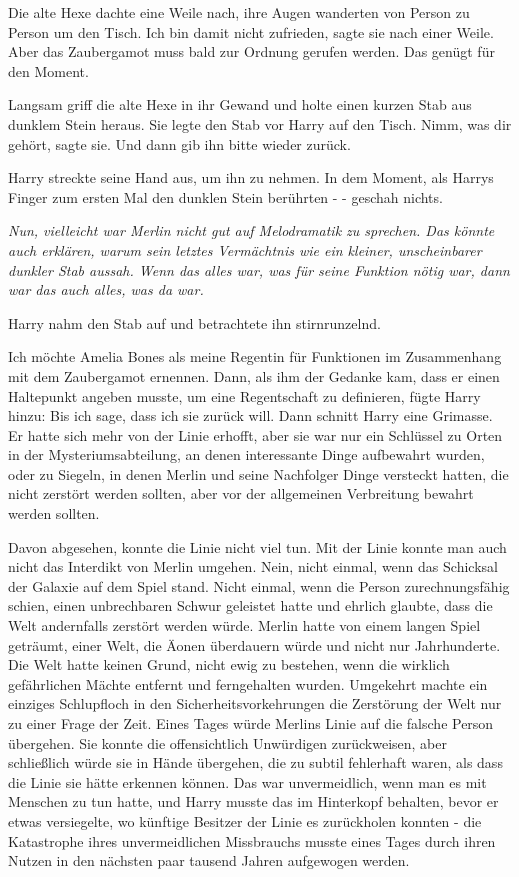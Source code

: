 Die alte Hexe dachte eine Weile nach, ihre Augen wanderten von Person zu Person
um den Tisch. \glqq{}Ich bin damit nicht zufrieden\grqq{}, sagte sie nach einer
Weile. \glqq{}Aber das Zaubergamot muss bald zur Ordnung gerufen werden. Das
genügt für den Moment.\grqq{}

Langsam griff die alte Hexe in ihr Gewand und holte einen kurzen Stab aus
dunklem Stein heraus. Sie legte den Stab vor Harry auf den Tisch. \glqq{}Nimm,
was dir gehört\grqq{}, sagte sie. \glqq{}Und dann gib ihn bitte wieder zurück.\grqq{}

Harry streckte seine Hand aus, um ihn zu nehmen. In dem Moment, als Harrys
Finger zum ersten Mal den dunklen Stein berührten - - geschah nichts.

\emph{Nun, vielleicht war Merlin nicht gut auf Melodramatik zu sprechen. Das
könnte auch erklären, warum sein letztes Vermächtnis wie ein kleiner,
unscheinbarer dunkler Stab aussah. Wenn das alles war, was für seine Funktion
nötig war, dann war das auch alles, was da war.}

Harry nahm den Stab auf und betrachtete ihn stirnrunzelnd.

\glqq{}Ich möchte Amelia Bones als meine Regentin für Funktionen im Zusammenhang
mit dem Zaubergamot ernennen.\grqq{} Dann, als ihm der Gedanke kam, dass er
einen Haltepunkt angeben musste, um eine Regentschaft zu definieren, fügte Harry
hinzu: \glqq{}Bis ich sage, dass ich sie zurück will.\grqq{} Dann schnitt Harry
eine Grimasse. Er hatte sich mehr von der Linie erhofft, aber sie war nur ein
Schlüssel zu Orten in der Mysteriumsabteilung, an denen interessante Dinge
aufbewahrt wurden, oder zu Siegeln, in denen Merlin und seine Nachfolger Dinge
versteckt hatten, die nicht zerstört werden sollten, aber vor der allgemeinen
Verbreitung bewahrt werden sollten.

Davon abgesehen, konnte die Linie nicht viel tun. Mit der Linie konnte man auch
nicht das Interdikt von Merlin umgehen. Nein, nicht einmal, wenn das Schicksal
der Galaxie auf dem Spiel stand. Nicht einmal, wenn die Person zurechnungsfähig
schien, einen unbrechbaren Schwur geleistet hatte und ehrlich glaubte, dass die
Welt andernfalls zerstört werden würde. Merlin hatte von einem langen Spiel
geträumt, einer Welt, die Äonen überdauern würde und nicht nur Jahrhunderte. Die
Welt hatte keinen Grund, nicht ewig zu bestehen, wenn die wirklich gefährlichen
Mächte entfernt und ferngehalten wurden. Umgekehrt machte ein einziges
Schlupfloch in den Sicherheitsvorkehrungen die Zerstörung der Welt nur zu einer
Frage der Zeit. Eines Tages würde Merlins Linie auf die falsche Person
übergehen. Sie konnte die offensichtlich Unwürdigen zurückweisen, aber
schließlich würde sie in Hände übergehen, die zu subtil fehlerhaft waren, als
dass die Linie sie hätte erkennen können. Das war unvermeidlich, wenn man es mit
Menschen zu tun hatte, und Harry musste das im Hinterkopf behalten, bevor er
etwas versiegelte, wo künftige Besitzer der Linie es zurückholen konnten - die
Katastrophe ihres unvermeidlichen Missbrauchs musste eines Tages durch ihren
Nutzen in den nächsten paar tausend Jahren aufgewogen werden.

